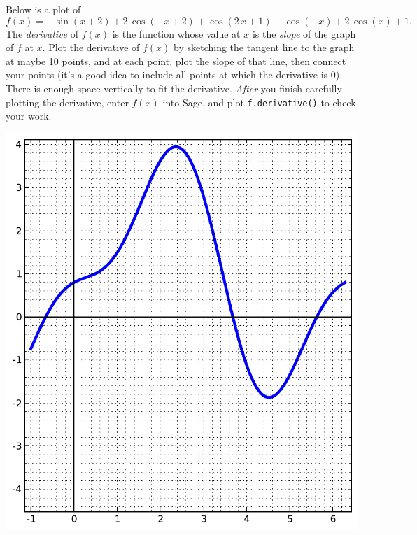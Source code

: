 Below is a plot of $$f(x)=-\sin\left(x + 2\right) + 2 \, \cos\left(-x + 2\right) + \cos\left(2 \, x + 1\right) - \cos\left(-x\right) + 2 \, \cos\left(x\right) + 1.$$  The {\em \color{red}derivative} of $f(x)$ is the function whose value at $x$ is the {\em slope} of the graph of $f$ at $x$.  Plot the derivative of $f(x)$ by sketching the tangent line to the graph at maybe 10 points, and at each point, plot the slope of that line, then connect your points (it's a good idea to include all points at which the derivative is 0).  There is enough space vertically to fit the derivative.  {\em After} you finish carefully plotting the derivative, enter $f(x)$ into Sage, and plot {\color{blue}\verb|f.derivative()|} to check your work.
\begin{center}\includegraphics{functions/48.pdf}\end{center}\newpage

